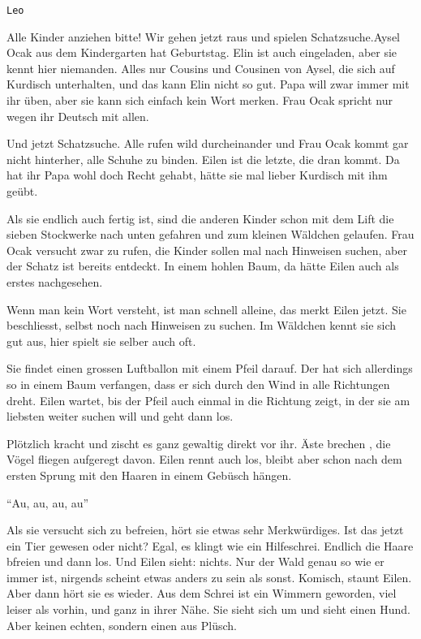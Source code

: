 \thispagestyle{empty}
\begin{center}
\end{center}
\vskip 2cm
{\Huge\color{farbe}\hfill{\tt{Leo}}}
\newpage
\lettrine[lines=2, lhang=.2, loversize=.25, lraise=0.05, findent=0.1em,
nindent=0em]{{\textooquote}A}{}lle Kinder anziehen bitte! Wir gehen jetzt raus und spielen Schatzsuche.\textcoquote Aysel Ocak aus dem Kindergarten hat Geburtstag. Elin ist auch eingeladen, aber sie kennt hier niemanden. Alles nur Cousins und Cousinen von Aysel, die sich auf Kurdisch unterhalten, und das kann Elin nicht so gut. Papa will zwar immer mit ihr üben, aber sie kann sich einfach kein Wort merken. Frau Ocak spricht nur wegen ihr Deutsch mit allen.

Und jetzt Schatzsuche. Alle rufen wild durcheinander und Frau Ocak kommt gar nicht hinterher, alle Schuhe zu binden. Eilen ist die letzte, die dran kommt. Da hat ihr Papa wohl doch Recht gehabt, hätte sie mal lieber Kurdisch mit ihm geübt.

Als sie endlich auch fertig ist, sind die anderen Kinder schon mit dem Lift die sieben Stockwerke nach unten gefahren und zum kleinen Wäldchen gelaufen. Frau Ocak versucht zwar zu rufen, die Kinder sollen mal nach Hinweisen suchen, aber der Schatz ist bereits entdeckt. In einem hohlen Baum, da hätte Eilen auch als erstes nachgesehen. 

Wenn man kein Wort versteht, ist man schnell alleine, das merkt Eilen jetzt. Sie beschliesst, selbst noch nach Hinweisen zu suchen. Im Wäldchen kennt sie sich gut aus, hier spielt sie selber auch oft. 

Sie findet einen grossen Luftballon mit einem Pfeil darauf. Der hat sich allerdings so in einem Baum verfangen, dass er sich durch den Wind in alle Richtungen dreht. Eilen wartet, bis der Pfeil auch einmal in die Richtung zeigt, in der sie am liebsten weiter suchen will und geht dann los.

Plötzlich kracht und zischt es ganz gewaltig direkt vor ihr. Äste brechen , die Vögel fliegen aufgeregt davon. Eilen rennt auch los, bleibt aber schon nach dem ersten Sprung mit den Haaren in einem Gebüsch hängen. 

\enquote{Au, au, au, au}

Als sie versucht sich zu befreien, hört sie etwas sehr Merkwürdiges. Ist das jetzt ein Tier gewesen oder nicht? Egal, es klingt wie ein Hilfeschrei. Endlich die Haare bfreien und dann los.  Und Eilen sieht: nichts. Nur der Wald genau so wie er immer ist, nirgends scheint etwas anders zu sein als sonst. Komisch, staunt Eilen. Aber dann hört sie es wieder. Aus dem Schrei ist ein Wimmern geworden, viel leiser als vorhin, und  ganz in ihrer Nähe. Sie sieht sich um und sieht einen Hund. Aber keinen echten, sondern einen aus Plüsch. 

